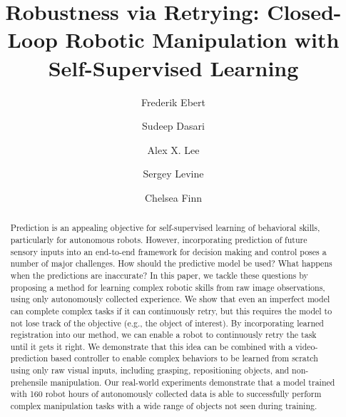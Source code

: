 \documentclass{article}
\title{Robustness via Retrying: Closed-Loop Robotic Manipulation with Self-Supervised Learning}
\author[1]{Frederik Ebert}
\author[1]{Sudeep Dasari}
\author[1]{Alex X. Lee}
\author[1]{Sergey Levine}
\author[1]{Chelsea Finn}
\affil[1]{\footnotesize Department of Electrical Engineering and Computer Sciences, UC Berkeley, United States}
\affil[ ]{\texttt{\{febert,sdasari,alexlee\_gk,svlevine,cbfinn\}@berkeley.edu}}
\begin{document}

\maketitle

\begin{abstract}
Prediction is an appealing objective for self-supervised learning of behavioral skills, particularly for autonomous robots. However, incorporating prediction of future sensory inputs into an end-to-end framework for decision making and control poses a number of major challenges. How should the predictive model be used? What happens when the predictions are inaccurate? In this paper, we tackle these questions by proposing a method for learning complex robotic skills from raw image observations, using only autonomously collected experience. We show that even an imperfect model can complete complex tasks if it can continuously retry, but this requires the model to not lose track of the objective (e.g., the object of interest). By incorporating  learned registration into our method, we can enable a robot to continuously retry the task until it gets it right. We demonstrate that this idea can be combined with a video-prediction based controller to enable complex behaviors to be learned from scratch using only raw visual inputs, including grasping, repositioning objects, and non-prehensile manipulation. Our real-world experiments demonstrate that a model trained with 160 robot hours of autonomously collected data is able to successfully perform complex manipulation tasks with a wide range of objects not seen during training.

\end{abstract}
\end{document}
